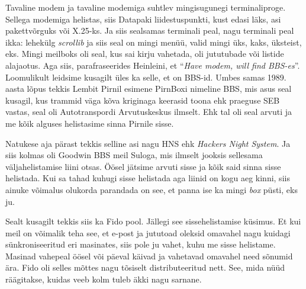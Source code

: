 
Tavaline modem ja tavaline modemiga suhtlev mingisugunegi terminaliproge. 
Sellega modemiga helistas, siis Datapaki liidestuspunkti, kust edasi läks, asi 
pakettvõrguks või X.25-ks. Ja siis sealsamas terminali peal, nagu terminali 
peal ikka: lehekülg \emph{scrollib} ja siis seal on mingi menüü, valid mingi 
üks, kaks, üksteist, eks. Mingi meilboks oli seal, kus sai kirju vahetada, oli  
jututubade või listide alajaotus. Aga siis,  parafraseerides Heinleini, et 
\enquote{\emph{Have modem, will find BBS-es}}. 
Loomulikult leidsime kusagilt üles ka selle, et on  BBS-id. Umbes samas 1989. 
aasta lõpus tekkis Lembit Pirnil esimene 
PirnBoxi nimeline  BBS, mis asus seal kusagil, kus trammid 
väga kõva kriginaga keerasid toona ehk praeguse SEB vastas, seal oli 
Autotranspordi Arvutuskeskus ilmselt. Ehk tal oli seal arvuti ja me 
kõik alguses helistasime  sinna Pirnile sisse. 

Natukese aja pärast tekkis selline asi nagu HNS ehk \emph{Hackers Night 
System}. Ja siis kolmas oli Goodwin BBS meil 
Suloga, mis  ilmselt jooksis sellesama 
väljahelistamise liini otsas. Öösel jätsime  arvuti sisse ja kõik said sinna 
sisse helistada. Kui sa tahad kuhugi sisse helistada aga liinid on kogu aeg 
kinni, siis ainuke võimalus olukorda parandada on see, et panna ise ka mingi 
\emph{box} püsti, eks ju. 

Sealt kusagilt tekkis siis ka Fido pool. Jällegi see sissehelistamise küsimus. 
Et kui meil on  võimalik teha see, et e-post ja jututoad oleksid omavahel nagu 
kuidagi  sünkroniseeritud eri masinates, siis pole ju vahet, kuhu me sisse 
helistame. Masinad vahepeal öösel või päeval käivad ja vahetavad omavahel need 
sõnumid ära. Fido oli selles mõttes nagu tõsiselt distributeeritud nett. See, 
mida nüüd räägitakse, kuidas  veeb kolm tuleb äkki nagu sarnane. 


